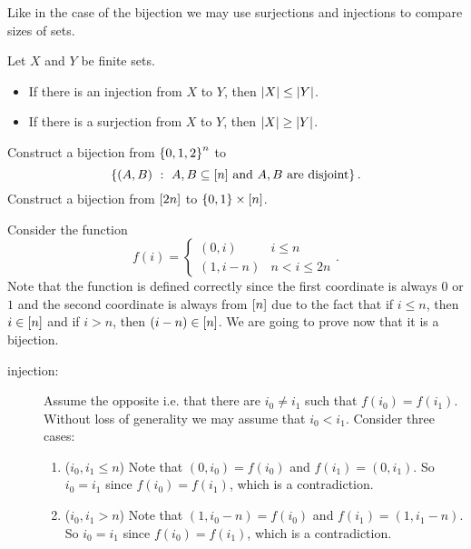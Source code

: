 Like in the case of the bijection we may use surjections and injections to
compare sizes of sets.
\begin{theorem}
\label{theorem:injections-surjections-inequalities}
    Let $X$ and $Y$ be finite sets.
    \begin{itemize}
        \item If there is an injection from $X$ to $Y$, then $\left|{X}\right|
          \le \left|{Y}\right|$.
        \item If there is a surjection from $X$ to $Y$, then $\left|{X}\right|
          \ge \left|{Y}\right|$.
    \end{itemize}
\end{theorem}

\begin{chapterendexercises}
  \exercise Construct a bijection from $\set{0, 1, 2}^n$ to
    \[
      \set[{A, B \subseteq \range{n} \text{ and } A, B \text{ are disjoint}}]{(A, B)}.
    \]
  \exercise[recommended] Construct a bijection from  ${[{2n}]}$ to 
    $\set{0, 1} \times \range{n}$.
    \begin{solution}
      Consider the function
      \[
        f(i) =
        \begin{cases}
          (0, i) & i \le n \\
          (1, i - n) & n < i \le 2n
        \end{cases}.
      \]
      Note that the function is defined correctly since the first coordinate is
      always $0$ or $1$ and the second coordinate is always from ${[{n}]}$ due to the
      fact that if $i \le n$, then $i \in {[{n}]}$ and if $i > n$, then 
      $(i - n) \in {[{n}]}$.
      We are going to prove now that it is a bijection.
      \begin{description}
        \item[injection:]
          Assume the opposite i.e. that there are $i_0 \neq i_1$ such that
          $f(i_0) = f(i_1)$. Without loss of generality we may assume that $i_0
          < i_1$.
          Consider three cases:
          \begin{enumerate}
            \item ($i_0, i_1 \le n$) Note that $(0, i_0) = f(i_0)$ and
              $f(i_1) = (0, i_1)$. So $i_0 = i_1$ since $f(i_0) = f(i_1)$, which
              is a contradiction.
            \item ($i_0, i_1 > n$) Note that $(1, i_0 - n) = f(i_0)$ and
              $f(i_1) = (1, i_1 - n)$. So $i_0 = i_1$ since $f(i_0) = f(i_1)$, which
              is a contradiction.

\end{enumerate}
\end{description}
\end{solution}
\end{chapterendexercises}
